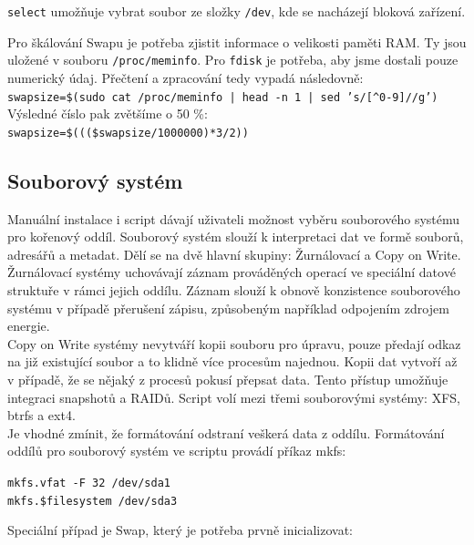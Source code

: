 \documentclass[12pt,a4paper,twoside,]{article}
\begin{document}
\texttt{select} umožňuje vybrat soubor ze složky \texttt{/dev}, kde se nacházejí bloková zařízení.
\newpage
{Pro škálování Swapu je potřeba zjistit informace o velikosti paměti RAM. Ty jsou uložené v souboru \texttt{/proc/meminfo}. Pro \texttt{fdisk} je potřeba, aby jsme dostali pouze numerický údaj. Přečtení a zpracování tedy vypadá následovně:\\
	
\texttt{swapsize=\$(sudo cat /proc/meminfo | head -n 1 | sed 's/[\^{}0-9]//g')}\\

\hspace*{-1.5em}Výsledné číslo pak zvětšíme o 50 \%:\\ 

\texttt{swapsize=\$(((\$swapsize/1000000)*3/2))}\\






\newpage
\subsection{\textsf{Souborový systém}}
Manuální instalace i script dávají uživateli možnost vyběru souborového systému pro kořenový oddíl.
Souborový systém slouží k interpretaci dat ve formě souborů, adresářů a metadat. Dělí se na dvě hlavní skupiny: Žurnálovací a Copy on Write.\\
Žurnálovací systémy uchovávají záznam prováděných operací ve speciální datové struktuře v rámci jejich oddílu. 
Záznam slouží k obnově konzistence souborového systému v případě přerušení zápisu, způsobeným například odpojením zdrojem energie. \\
Copy on Write systémy nevytváří kopii souboru pro úpravu, pouze předají odkaz na již existující soubor a to klidně více procesům najednou.
Kopii dat vytvoří až v případě, že se nějaký z procesů pokusí přepsat data. Tento přístup umožňuje integraci snapshotů a RAIDů.
Script volí mezi třemi souborovými systémy: XFS, btrfs a ext4. \\Je vhodné zmínit, že formátování odstraní veškerá data z oddílu. 
Formátování oddílů pro souborový systém ve scriptu provádí příkaz mkfs: 

\texttt{mkfs.vfat -F 32 /dev/sda1}\\
\texttt{\hspace*{1.5em}mkfs.\$filesystem /dev/sda3}

Speciální případ je Swap, který je potřeba prvně inicializovat: 

}
\end{document}
